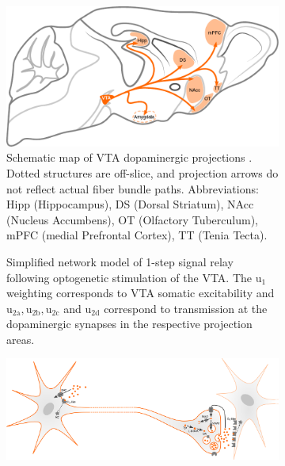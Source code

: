 \begin{sansmath}
\begin{figure}[h!]
	\centering
	\hspace*{\fill}
	\begin{subfigure}{.527\textwidth}
		\centering
		\includegraphics[width=\textwidth]{img/model_literature}
		\caption{
			Schematic map of VTA dopaminergic projections \cite{Aransay2015,Fields2007,Ikemoto2007,Hnasko2012,Pan2010}.
			Dotted structures are off-slice, and projection arrows do not reflect actual fiber bundle paths.
			Abbreviations: Hipp (Hippocampus), DS (Dorsal Striatum), NAcc (Nucleus Accumbens), OT (Olfactory Tuberculum), mPFC (medial Prefrontal Cortex), TT (Tenia Tecta).
			}
		\label{fig:ml}
	\end{subfigure}\hfill
	\begin{subfigure}{.44\textwidth}
		\centering
		\vspace{-1em}
		\vspace{-0.6em}
		\caption{
			Simplified network model of 1-step signal relay following optogenetic stimulation of the VTA.
			The $\mathrm{u_1}$ weighting corresponds to VTA somatic excitability and $\mathrm{u_{2a},u_{2b},u_{2c}}$ and $\mathrm{u_{2d}}$ correspond to transmission at the dopaminergic synapses in the respective projection areas.
			}
		\label{fig:nm}
	\end{subfigure}
	\hspace*{\fill}
	\begin{subfigure}{.985\textwidth}
		\centering
		\includegraphics[width=\textwidth]{img/da}

\end{subfigure}
\end{figure}
\end{sansmath}
